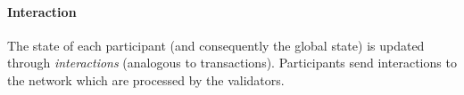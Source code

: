 



\paragraph{\textbf{Interaction}}
The state of each participant (and consequently the global state) is updated through \emph{interactions} (analogous to transactions).
Participants send interactions to the network which are processed by the validators.


